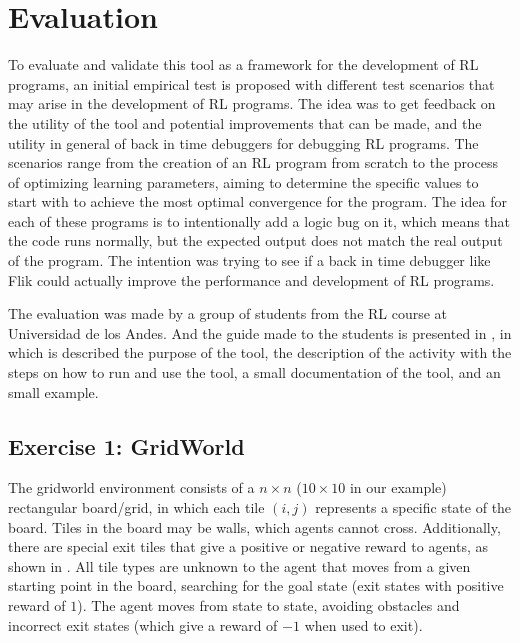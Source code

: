 
\chapter{Evaluation}
\label{cha:evaluation}

To evaluate and validate this tool as a framework for the development 
of \ac{RL} programs, an initial empirical test is proposed with different test scenarios 
that may arise in the development of \ac{RL} programs. The idea was to get feedback on 
the utility of the tool and potential improvements that can be made, 
and the utility in general of back in time debuggers for debugging \ac{RL} programs. 
The scenarios range from 
the creation of an \ac{RL} program from scratch to the process of optimizing 
learning parameters, aiming to determine the specific values to start with 
to achieve the most optimal convergence for the program. The idea for each of these 
programs is to intentionally add a logic bug on it, which means that the code runs 
normally, but the expected output does not match the real output of the program. 
The intention was trying to see if a back in time debugger like \ac{Flik} could 
actually improve the performance and development of \ac{RL} programs.

The evaluation was made by a group of students from the \ac{RL} course at Universidad de los Andes.
And the guide made to the students is presented in , in which 
is described the purpose of the tool, the description of the activity with the steps on how to run and 
use the tool, a small documentation of the tool, and an small example.

\section{Exercise 1: GridWorld}
\label{sec:grid-eval}

The gridworld environment consists of a $n\times n$ ($10\times 10$ in our example) rectangular 
board/grid, in which each tile $(i,j)$ represents a specific state of the board. Tiles in the board may be 
walls, which agents cannot cross. Additionally, there are special exit 
tiles that give a positive or negative reward to agents, as shown in . All tile types 
are unknown to the agent that moves from a given starting point in the board, searching for the goal 
state (\ie exit states with positive reward of $1$). The agent moves from state to state, avoiding 
obstacles and incorrect exit states (which give a reward of $-1$ when used to exit). 

